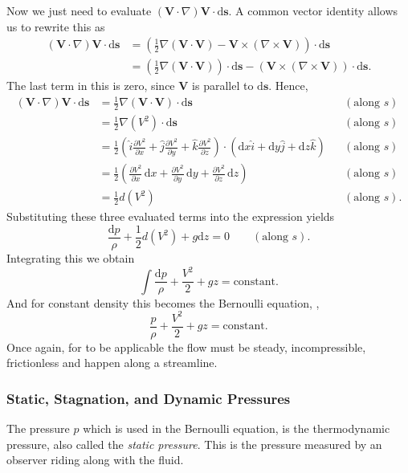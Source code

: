 Now we just need to evaluate $\left( \textbf{V}\cdot \nabla  \right)\textbf{V}\cdot \mathrm{d}\textbf{s}$. A common vector identity allows us to rewrite this as
\begin{align*}
  \left( \textbf{V}\cdot \nabla  \right)\textbf{V}\cdot \mathrm{d}\textbf{s} &= \left( \frac{1}{2} \nabla \left( \textbf{V} \cdot \textbf{V} \right) - \textbf{V} \times \left( \nabla \times \textbf{V} \right) \right) \cdot \mathrm{d}\textbf{s} \\
      &= \left( \frac{1}{2}\nabla  \left( \textbf{V} \cdot \textbf{V} \right) \right)  \cdot \mathrm{d}\textbf{s} - \left( \textbf{V} \times \left( \nabla \times \textbf{V} \right) \right) \cdot \mathrm{d}\textbf{s}
.\end{align*}
The last term in this is zero, since $\textbf{V}$ is parallel to $\mathrm{d}\textbf{s}$. Hence,
\begin{align*}
  \left( \textbf{V} \cdot \nabla  \right) \textbf{V} \cdot \mathrm{d} \textbf{s} &= \frac{1}{2} \nabla  \left( \textbf{V} \cdot \textbf{V} \right) \cdot \mathrm{d}\textbf{s} &&\left( \text{along }s \right) \\
  &= \frac{1}{2} \nabla \left( V^2 \right) \cdot \mathrm{d}\textbf{s} &&(\text{along }s) \\
  &= \frac{1}{2} \left( \hat{i} \frac{\partial V^2}{\partial x} + \hat{j} \frac{\partial V^2}{\partial y} + \hat{k} \frac{\partial V^2}{\partial z}  \right) \cdot \left( \mathrm{d}x \hat{i} + \mathrm{d}y \hat{j} + \mathrm{d}z \hat{k} \right) &&(\text{along }s)\\
  &= \frac{1}{2} \left( \frac{\partial V^2}{\partial x} \, \mathrm{d}x + \frac{\partial V^2}{\partial y} \, \mathrm{d}y + \frac{\partial V^2}{\partial z} \, \mathrm{d}z \right) &&(\text{along }s)\\
  &= \frac{1}{2} d \left( V^2 \right) &&(\text{along }s)
.\end{align*}
Substituting these three evaluated terms into the expression yields
\[ 
\frac{\mathrm{d}p}{\rho} + \frac{1}{2}d \left( V^2 \right) + g \mathrm{d}z = 0 \qquad (\text{along }s)
.\]
Integrating this we obtain
\[ 
\int \frac{\mathrm{d}p}{\rho} + \frac{V^2}{2} + gz = \mathrm{constant}
.\]
And for constant density this becomes the Bernoulli equation, ,
\[ 
\frac{p}{\rho} + \frac{V^2}{2} + gz = \mathrm{constant}
.\]
Once again, for  to be applicable the flow must be steady, incompressible, frictionless and happen along a streamline. 

\subsubsection{Static, Stagnation, and Dynamic Pressures}
The pressure $p$ which is used in the Bernoulli equation,  is the thermodynamic pressure, also called the \textit{static pressure}. This is the pressure measured by an observer riding along with the fluid. 

